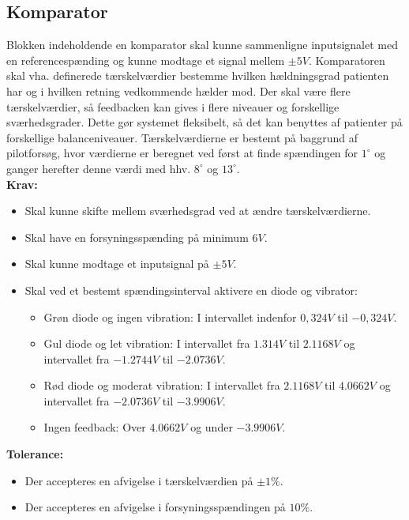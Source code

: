 \subsection{Komparator}\label{KomparatorAfs} 
Blokken indeholdende en komparator skal kunne sammenligne inputsignalet med en referencespænding og kunne modtage et signal mellem $\pm5V$. Komparatoren skal vha. definerede tærskelværdier bestemme hvilken hældningsgrad patienten har og i hvilken retning vedkommende hælder mod. Der skal være flere tærskelværdier, så feedbacken kan gives i flere niveauer og forskellige sværhedsgrader. Dette gør systemet fleksibelt, så det kan benyttes af patienter på forskellige balanceniveauer. Tærskelværdierne er bestemt på baggrund af pilotforsøg, hvor værdierne er beregnet ved først at finde spændingen for $1^{\circ}$ og ganger herefter denne værdi med hhv. $8^{\circ}$ og $13^{\circ}$.\\
\textbf{Krav:} 
\begin{itemize}
	\item Skal kunne skifte mellem sværhedsgrad ved at ændre tærskelværdierne.
	\item Skal have en forsyningsspænding på minimum $6V$.
	\item Skal kunne modtage et inputsignal på $\pm5V$. 
	\item Skal ved et bestemt spændingsinterval aktivere en diode og vibrator:
	\begin{itemize}
		\item Grøn diode og ingen vibration: I intervallet indenfor $0,324V$ til $-0,324V$.
		\item Gul diode og let vibration: I intervallet fra $1.314V$ til $2.1168V$ og intervallet fra $-1.2744V$ til $-2.0736V$.
		\item Rød diode og moderat vibration: I intervallet fra $2.1168V$ til $4.0662V$ og intervallet fra $-2.0736V$ til $-3.9906V$.
		\item Ingen feedback: Over $4.0662V$ og under $-3.9906V$. 
	\end{itemize}
\end{itemize}
\textbf{Tolerance:}
\begin{itemize}
	\item Der accepteres en afvigelse i tærskelværdien på $\pm1\%$.
	\item Der accepteres en afvigelse i forsyningsspændingen på $10\%$.
\end{itemize}
